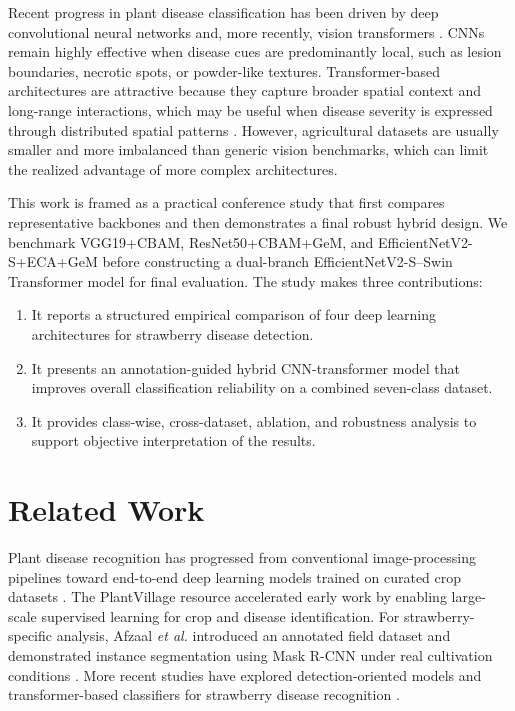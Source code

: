 \documentclass[conference]{IEEEtran}
\begin{document}
Recent progress in plant disease classification has been driven by deep convolutional neural networks and, more recently, vision transformers \cite{resnet2016,swin2021,coatnet2021}. CNNs remain highly effective when disease cues are predominantly local, such as lesion boundaries, necrotic spots, or powder-like textures. Transformer-based architectures are attractive because they capture broader spatial context and long-range interactions, which may be useful when disease severity is expressed through distributed spatial patterns \cite{cvt2021,swin2021}. However, agricultural datasets are usually smaller and more imbalanced than generic vision benchmarks, which can limit the realized advantage of more complex architectures.

This work is framed as a practical conference study that first compares representative backbones and then demonstrates a final robust hybrid design. We benchmark VGG19+CBAM, ResNet50+CBAM+GeM, and EfficientNetV2-S+ECA+GeM before constructing a dual-branch EfficientNetV2-S--Swin Transformer model for final evaluation. The study makes three contributions:
\begin{enumerate}
    \item It reports a structured empirical comparison of four deep learning architectures for strawberry disease detection.
    \item It presents an annotation-guided hybrid CNN-transformer model that improves overall classification reliability on a combined seven-class dataset.
    \item It provides class-wise, cross-dataset, ablation, and robustness analysis to support objective interpretation of the results.
\end{enumerate}

\section{Related Work}
Plant disease recognition has progressed from conventional image-processing pipelines toward end-to-end deep learning models trained on curated crop datasets \cite{mohanty2016,ferentinos2018}. The PlantVillage resource accelerated early work by enabling large-scale supervised learning for crop and disease identification. For strawberry-specific analysis, Afzaal \textit{et al.} introduced an annotated field dataset and demonstrated instance segmentation using Mask R-CNN under real cultivation conditions \cite{afzaal2021}. More recent studies have explored detection-oriented models and transformer-based classifiers for strawberry disease recognition \cite{antonini2024,berrynet2024}.
\end{document}
